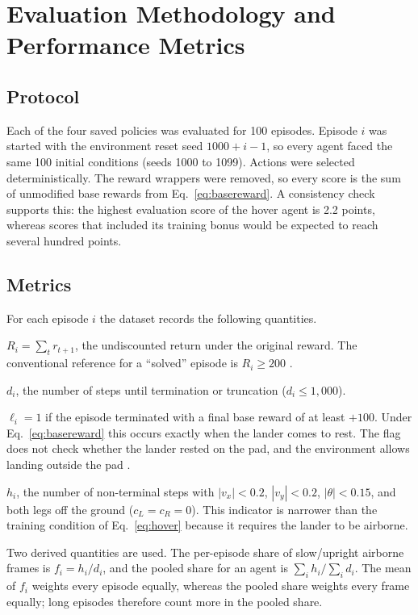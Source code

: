 \documentclass[11pt,a4paper]{article}
\begin{document}
\section{Evaluation Methodology and Performance Metrics}\label{sec:evaluation}

\subsection{Protocol}

Each of the four saved policies was evaluated for 100 episodes. Episode $i$ was started with the environment reset seed $1000+i-1$, so every agent faced the same 100 initial conditions (seeds 1000 to 1099). Actions were selected deterministically. The reward wrappers were removed, so every score is the sum of unmodified base rewards from Eq.~\eqref{eq:basereward}. A consistency check supports this: the highest evaluation score of the hover agent is 2.2 points, whereas scores that included its training bonus would be expected to reach several hundred points.

\subsection{Metrics}

For each episode $i$ the dataset records the following quantities.
\begin{description}[leftmargin=1.2em,font=\normalfont\bfseries]
  \item[Score.] $R_i=\sum_t r_{t+1}$, the undiscounted return under the original reward. The conventional reference for a ``solved'' episode is $R_i\geq200$ \cite{gymLunar}.
  \item[Duration.] $d_i$, the number of steps until termination or truncation ($d_i\leq1{,}000$).
  \item[Landing flag.] $\ell_i=1$ if the episode terminated with a final base reward of at least $+100$. Under Eq.~\eqref{eq:basereward} this occurs exactly when the lander comes to rest. The flag does not check whether the lander rested on the pad, and the environment allows landing outside the pad \cite{gymSource}.
  \item[Slow/upright airborne frames.] $h_i$, the number of non-terminal steps with $|v_x|<0.2$, $|v_y|<0.2$, $|\theta|<0.15$, and both legs off the ground ($c_L=c_R=0$). This indicator is narrower than the training condition of Eq.~\eqref{eq:hover} because it requires the lander to be airborne.
\end{description}
Two derived quantities are used. The per-episode share of slow/upright airborne frames is $f_i = h_i/d_i$, and the pooled share for an agent is $\sum_i h_i/\sum_i d_i$. The mean of $f_i$ weights every episode equally, whereas the pooled share weights every frame equally; long episodes therefore count more in the pooled share.
\end{document}
